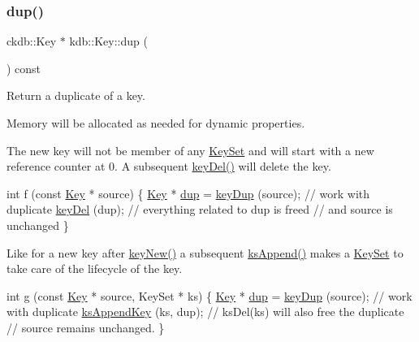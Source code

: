 \subsubsection{\texorpdfstring{dup()}{dup()}}
{\footnotesize\ttfamily ckdb\+::\+Key $\ast$ kdb\+::\+Key\+::dup (\begin{DoxyParamCaption}{ }\end{DoxyParamCaption}) const\hspace{0.3cm}{\ttfamily [inline]}}



Return a duplicate of a key. 

Memory will be allocated as needed for dynamic properties.

The new key will not be member of any \hyperlink{classkdb_1_1KeySet}{Key\+Set} and will start with a new reference counter at 0. A subsequent \hyperlink{group__key_ga3df95bbc2494e3e6703ece5639be5bb1}{key\+Del()} will delete the key.


\begin{DoxyCode}
\textcolor{keywordtype}{int} f (\textcolor{keyword}{const} \hyperlink{classkdb_1_1Key_a5679f5cae63caddd64a60388b9cc77fa}{Key} * source)
\{
        \hyperlink{classkdb_1_1Key_a5679f5cae63caddd64a60388b9cc77fa}{Key} * \hyperlink{classkdb_1_1Key_ababb1ccd9f18db379eb4a62f8db87bf5}{dup} = \hyperlink{group__key_gae6ec6a60cc4b8c1463fa08623d056ce3}{keyDup} (source);
        \textcolor{comment}{// work with duplicate}
        \hyperlink{group__key_ga3df95bbc2494e3e6703ece5639be5bb1}{keyDel} (dup);
        \textcolor{comment}{// everything related to dup is freed}
        \textcolor{comment}{// and source is unchanged}
\}
\end{DoxyCode}


Like for a new key after \hyperlink{group__key_gad23c65b44bf48d773759e1f9a4d43b89}{key\+New()} a subsequent \hyperlink{group__keyset_ga21eb9c3a14a604ee3a8bdc779232e7b7}{ks\+Append()} makes a \hyperlink{classkdb_1_1KeySet}{Key\+Set} to take care of the lifecycle of the key.


\begin{DoxyCode}
\textcolor{keywordtype}{int} g (\textcolor{keyword}{const} \hyperlink{classkdb_1_1Key_a5679f5cae63caddd64a60388b9cc77fa}{Key} * source, KeySet * ks)
\{
        \hyperlink{classkdb_1_1Key_a5679f5cae63caddd64a60388b9cc77fa}{Key} * \hyperlink{classkdb_1_1Key_ababb1ccd9f18db379eb4a62f8db87bf5}{dup} = \hyperlink{group__key_gae6ec6a60cc4b8c1463fa08623d056ce3}{keyDup} (source);
        \textcolor{comment}{// work with duplicate}
        \hyperlink{group__keyset_gaa5a1d467a4d71041edce68ea7748ce45}{ksAppendKey} (ks, dup);
        \textcolor{comment}{// ksDel(ks) will also free the duplicate}
        \textcolor{comment}{// source remains unchanged.}
\}
\end{DoxyCode}


